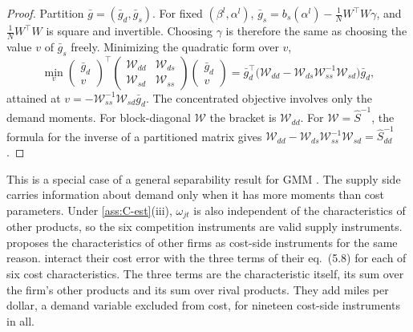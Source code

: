 \begin{proof}
Partition $\bar g = (\bar g_d, \bar g_s)$. For fixed $(\beta^l, \alpha^l)$, $\bar g_s = b_s(\alpha^l) - \frac{1}{N}W^\top
W\gamma$, and $\frac{1}{N}W^\top W$ is square and invertible. Choosing $\gamma$ is therefore the same as choosing the value
$v$ of $\bar g_s$ freely. Minimizing the quadratic form over $v$,
\[
  \min_v\begin{pmatrix}\bar g_d \\ v\end{pmatrix}^\top
  \begin{pmatrix}\mathcal W_{dd} & \mathcal W_{ds} \\ \mathcal W_{sd} & \mathcal W_{ss}\end{pmatrix}
  \begin{pmatrix}\bar g_d \\ v\end{pmatrix}
  = \bar g_d^\top\big(\mathcal W_{dd} - \mathcal W_{ds}\mathcal W_{ss}^{-1}\mathcal W_{sd}\big)\bar g_d ,
\]
attained at $v = -\mathcal W_{ss}^{-1}\mathcal W_{sd}\bar g_d$. The concentrated objective involves only the demand
moments. For block-diagonal $\mathcal W$ the bracket is $\mathcal W_{dd}$. For $\mathcal W = \hat S^{-1}$, the formula for the
inverse of a partitioned matrix gives $\mathcal W_{dd} - \mathcal W_{ds}\mathcal W_{ss}^{-1}\mathcal W_{sd} = \hat S_{dd}^{-1}$.
\end{proof}

This is a special case of a general separability result for GMM \citep{AhnSchmidt1995}. The supply side carries
information about demand only when it has more moments than cost parameters. Under \cref{ass:C-est}(iii), $\omega_{jt}$ is
also independent of the characteristics of other products, so the six competition instruments are valid supply
instruments. \citet[p.~255]{Berry1994} proposes the characteristics of other firms as cost-side instruments for the same
reason. \citet[pp.~861--862]{BerryLevinsohnPakes1995} interact their cost error with the three terms of their eq.~(5.8)
for each of six cost characteristics. The three terms are the characteristic itself, its sum over the firm's other
products and its sum over rival products. They add miles per dollar, a demand variable excluded from cost, for nineteen cost-side
instruments in all.

